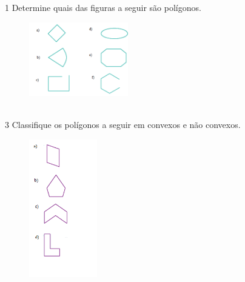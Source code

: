 {{%




\pagebreak

\num{1} Determine quais das figuras a seguir são polígonos.

\begin{figure}[H]
\centering\includegraphics[width=1.7in,height=1.26763in]{./imgSAEB_8_MAT/media/image7.png}
\end{figure}
\\

\num{3} Classifique os polígonos a seguir em convexos e não convexos.

\begin{figure}[H]
\centering\includegraphics[width=1.16236in,height=2.36667in]{./imgSAEB_8_MAT/media/image8.png}
\end{figure}

}}
